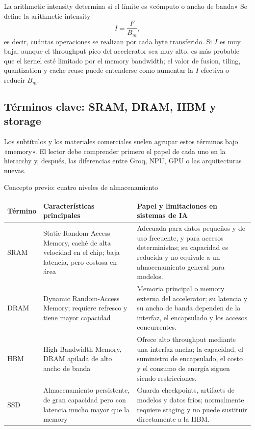 \documentclass[a4paper]{article}
\begin{document}
\begin{importantbox}{La arithmetic intensity determina si el límite es «cómputo o ancho de banda»}
Se define la arithmetic intensity
\[
I=\frac{F}{B_m},
\]
es decir, cuántas operaciones se realizan por cada byte transferido. Si $I$ es muy baja, aunque el throughput pico del accelerator sea muy alto, es más probable que el kernel esté limitado por el memory bandwidth; el valor de fusion, tiling, quantization y cache reuse puede entenderse como aumentar la $I$ efectiva o reducir $B_m$.
\end{importantbox}

\subsection{Términos clave: SRAM, DRAM, HBM y storage}

Los subtítulos y los materiales comerciales suelen agrupar estos términos bajo «memory». El lector debe comprender primero el papel de cada uno en la hierarchy y, después, las diferencias entre Groq, NPU, GPU o las arquitecturas nuevas.

\begin{knowledgebox}{Concepto previo: cuatro niveles de almacenamiento}
\begin{tabularx}{\textwidth}{L{0.17\textwidth}L{0.24\textwidth}X}
\toprule
Término & Características principales & Papel y limitaciones en sistemas de IA \\
\midrule
SRAM & Static Random-Access Memory, caché de alta velocidad en el chip; baja latencia, pero costosa en área & Adecuada para datos pequeños y de uso frecuente, y para accesos deterministas; su capacidad es reducida y no equivale a un almacenamiento general para modelos. \\
DRAM & Dynamic Random-Access Memory; requiere refresco y tiene mayor capacidad & Memoria principal o memory externa del accelerator; su latencia y su ancho de banda dependen de la interfaz, el encapsulado y los accesos concurrentes. \\
HBM & High Bandwidth Memory, DRAM apilada de alto ancho de banda & Ofrece alto throughput mediante una interfaz ancha; la capacidad, el suministro de encapsulado, el costo y el consumo de energía siguen siendo restricciones. \\
SSD & Almacenamiento persistente, de gran capacidad pero con latencia mucho mayor que la memory & Guarda checkpoints, artifacts de modelos y datos fríos; normalmente requiere staging y no puede sustituir directamente a la HBM. \\
\bottomrule
\end{tabularx}
\end{knowledgebox}
\end{document}
